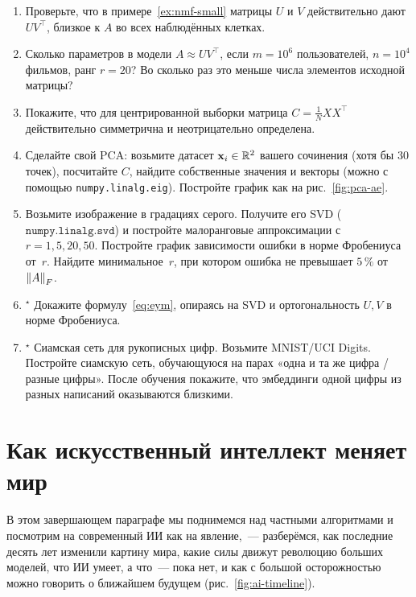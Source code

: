 \begin{tasksbox}
\begin{enumerate}\itemsep1pt
  \item Проверьте, что в примере~\ref{ex:nmf-small} матрицы $U$ и $V$
        действительно дают $UV^{\top}$, близкое к $A$ во всех
        наблюдённых клетках.
  \item Сколько параметров в модели $A\approx UV^{\top}$, если $m=10^{6}$
        пользователей, $n=10^{4}$ фильмов, ранг $r=20$? Во сколько раз
        это меньше числа элементов исходной матрицы?
  \item Покажите, что для центрированной выборки матрица $C=\frac{1}{N}XX^{\top}$
        действительно симметрична и неотрицательно определена.
  \item Сделайте свой PCA: возьмите датасет $\mathbf x_i\in\mathbb{R}^{2}$
        вашего сочинения (хотя бы 30 точек), посчитайте $C$, найдите
        собственные значения и векторы (можно с помощью
        \texttt{numpy.linalg.eig}). Постройте график как на
        рис.~\ref{fig:pca-ae}.
  \item Возьмите изображение в градациях серого. Получите его SVD
        ($\texttt{numpy.linalg.svd}$) и постройте малоранговые
        аппроксимации с $r=1,5,20,50$. Постройте график зависимости
        ошибки в норме Фробениуса от~$r$. Найдите минимальное~$r$, при
        котором ошибка не превышает $5\,\%$ от $\left\|A\right\|_{F}$.
  \item$^{\star}$ Докажите формулу~\eqref{eq:eym}, опираясь на SVD и
        ортогональность $U,V$ в норме Фробениуса.
  \item$^{\star}$ Сиамская сеть для рукописных цифр. Возьмите MNIST/UCI
        Digits. Постройте сиамскую сеть, обучающуюся на парах
        «одна и та же цифра / разные цифры». После обучения покажите,
        что эмбеддинги одной цифры из разных написаний оказываются
        близкими.
\end{enumerate}
\end{tasksbox}

\section{Как искусственный интеллект меняет мир}
\label{sec:future}

В этом завершающем параграфе мы поднимемся над частными алгоритмами и
посмотрим на современный ИИ как на явление,~--- разберёмся, как
последние десять лет изменили картину мира, какие силы движут
революцию больших моделей, что ИИ умеет, а что~--- пока нет, и как с
большой осторожностью можно говорить о ближайшем будущем (рис.~\ref{fig:ai-timeline}).

